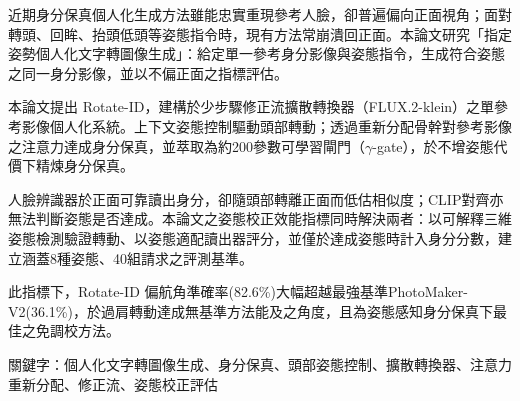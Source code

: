 近期身分保真個人化生成方法雖能忠實重現參考人臉，卻普遍偏向正面視角；面對轉頭、回眸、抬頭低頭等姿態指令時，現有方法常崩潰回正面。本論文研究「指定姿勢個人化文字轉圖像生成」：給定單一參考身分影像與姿態指令，生成符合姿態之同一身分影像，並以不偏正面之指標評估。

本論文提出 Rotate-ID，建構於少步驟修正流擴散轉換器（FLUX.2-klein）之單參考影像個人化系統。上下文姿態控制驅動頭部轉動；透過重新分配骨幹對參考影像之注意力達成身分保真，並萃取為約200參數可學習閘門（$\gamma$-gate），於不增姿態代價下精煉身分保真。

人臉辨識器於正面可靠讀出身分，卻隨頭部轉離正面而低估相似度；CLIP對齊亦無法判斷姿態是否達成。本論文之姿態校正效能指標同時解決兩者：以可解釋三維姿態檢測驗證轉動、以姿態適配讀出器評分，並僅於達成姿態時計入身分分數，建立涵蓋8種姿態、40組請求之評測基準。

此指標下，Rotate-ID 偏航角準確率(82.6\%)大幅超越最強基準PhotoMaker-V2(36.1\%)，於過肩轉動達成無基準方法能及之角度，且為姿態感知身分保真下最佳之免調校方法。

\vspace{1em}
\noindent 關鍵字：個人化文字轉圖像生成、身分保真、頭部姿態控制、擴散轉換器、注意力重新分配、修正流、姿態校正評估
